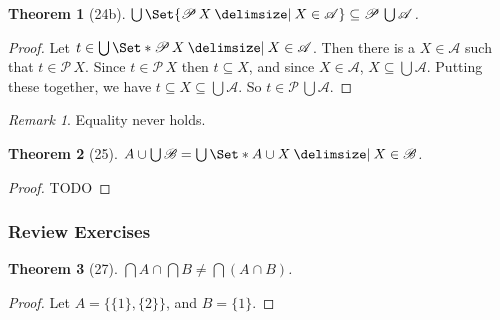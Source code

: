 \documentclass[12pt]{article}
\theoremstyle{plain}
\newtheorem*{exthm}{Theorem}
\theoremstyle{remark}
\theoremstyle{definition}
\theoremstyle{remark}
\newtheorem*{remark}{Remark}
\newcommand{\powerset}{\mathscr{P}\,}
\providecommand\st{}
\newcommand\SetSymbol[1][]{%
  \nonscript\:#1\vert%
  \allowbreak%
  \nonscript\:
\mathopen{}}
\renewcommand\st{\SetSymbol[\delimsize]}
\begin{document}
\begin{exthm}[24b]
  $\bigcup \Set{\powerset X \st X \in \mathscr{A}} \subseteq \powerset \bigcup \mathscr{A}$.
\end{exthm}
\begin{proof}
  Let $t \in \bigcup \Set*{\powerset X \st X \in \mathscr{A}}$. Then there is a $X \in \mathscr{A}$ such that $t \in \powerset X$. Since $t \in \powerset X$ then $t \subseteq X$, and since $X \in \mathscr{A}$, $X \subseteq \bigcup \mathscr{A}$. Putting these together, we have $t \subseteq X \subseteq \bigcup \mathscr{A}$. So $t \in \powerset \bigcup \mathscr{A}$.
\end{proof}
\begin{remark}
  Equality never holds.
\end{remark}

\begin{exthm}[25]
  $A \cup \bigcup \mathscr{B} = \bigcup\Set*{A \cup X \st X \in \mathscr{B}}$.
\end{exthm}
\begin{proof}
  TODO
\end{proof}

\subsubsection{Review Exercises}
\begin{exthm}[27]
  $\bigcap A \cap \bigcap B \neq \bigcap(A \cap B)$.
\end{exthm}
\begin{proof}
  Let $A = \{\{1\}, \{2\}\}$, and $B = \{1\}$.
\end{proof}
\end{document}
